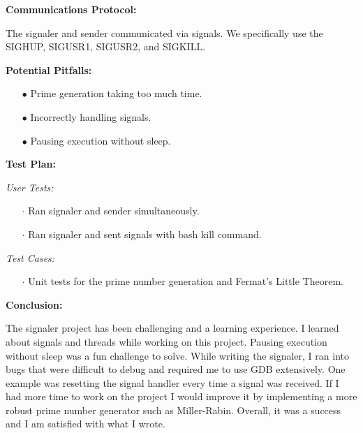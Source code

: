 \documentclass{article}
\begin{document}
\begin{flushleft}
\textbf{Communications Protocol:}
\vspace{.5pc}
\end{flushleft}

The signaler and sender communicated via signals. We specifically use the 
SIGHUP, SIGUSR1, SIGUSR2, and SIGKILL. 
\vspace{.5pc}

\begin{flushleft}
\textbf{Potential Pitfalls:}
\vspace{.5pc}
\end{flushleft}

\begin{itemize}
	\item[$\bullet$] Prime generation taking too much time.
	\item[$\bullet$] Incorrectly handling signals.
	\item[$\bullet$] Pausing execution without sleep.
\end{itemize}
\vspace{.5pc}

\begin{flushleft}
\textbf{Test Plan:}
\vspace{.5pc}
\end{flushleft}

\textit{User Tests:}
\begin{itemize}
	\item[$\cdot$] Ran signaler and sender simultaneously.
	\item[$\cdot$] Ran signaler and sent signals with bash kill command. 
\end{itemize}

\textit{Test Cases:}
\begin{itemize}
	\item[$\cdot$] Unit tests for the prime number generation and Fermat's
	Little Theorem.
	\end{itemize}
\vspace{.5pc}

\begin{flushleft}
\textbf{Conclusion:}
\vspace{.5pc}
\end{flushleft}

The signaler project has been challenging and a learning experience. I learned 
about signals and threads while working on this project. Pausing execution 
without sleep was a fun challenge to solve. While writing the signaler, I
ran into bugs that were difficult to debug and required me to use GDB 
extensively. One example was resetting the signal handler every time a signal
was received. If I had more time to work on the project I would improve it
by implementing a more robust prime number generator such as Miller-Rabin.
Overall, it was a success and I am satisfied with what I wrote. 
\end{document}
